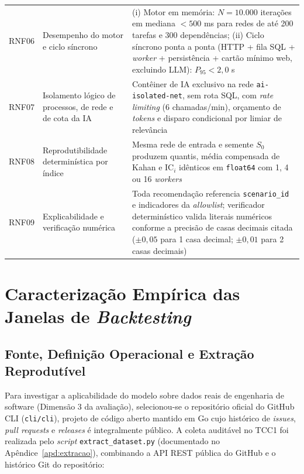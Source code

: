 \documentclass[12pt,openany,oneside,a4paper,english,brazilian,sumario=tradicional]{abntex2}
\newcommand{\fonteautores}{\par\vspace{1mm}{\small Fonte: Elaborado pelos autores (2026).}}
\newcommand{\IC}{\mathrm{IC}}
\begin{document}
\begin{table}[htbp]
\begin{tabularx}{\textwidth}{L{1.2cm} L{4.0cm} Y}
RNF06 & Desempenho do motor e ciclo síncrono & (i) Motor em memória: $N=10.000$ iterações em mediana $< 500$ ms para redes de até 200 tarefas e 300 dependências; (ii) Ciclo síncrono ponta a ponta (HTTP + fila SQL + \textit{worker} + persistência + cartão mínimo web, excluindo LLM): $P_{95} < 2{,}0$ s\\
RNF07 & Isolamento lógico de processos, de rede e de cota da IA & Contêiner de IA exclusivo na rede \texttt{ai-isolated-net}, sem rota SQL, com \textit{rate limiting} (6 chamadas/min), orçamento de \textit{tokens} e disparo condicional por limiar de relevância\\
RNF08 & Reprodutibilidade determinística por índice & Mesma rede de entrada e semente $S_0$ produzem quantis, média compensada de Kahan e $\IC_i$ idênticos em \texttt{float64} com 1, 4 ou 16 \textit{workers}\\
RNF09 & Explicabilidade e verificação numérica & Toda recomendação referencia \texttt{scenario\_\allowbreak id} e indicadores da \textit{allowlist}; verificador determinístico valida literais numéricos conforme a precisão de casas decimais citada ($\pm 0{,}05$ para 1 casa decimal; $\pm 0{,}01$ para 2 casas decimais)\\
\bottomrule
\end{tabularx}
\fonteautores
\end{table}

\section{Caracterização Empírica das Janelas de \textit{Backtesting}}\label{sec:backtesting}

\subsection{Fonte, Definição Operacional e Extração Reprodutível}

Para investigar a aplicabilidade do modelo sobre dados reais de engenharia de software (Dimensão 3 da avaliação), selecionou-se o repositório oficial do GitHub CLI (\texttt{cli/\allowbreak cli}), projeto de código aberto mantido em Go cujo histórico de \textit{issues}, \textit{pull requests} e \textit{releases} é integralmente público. A coleta auditável no TCC1 foi realizada pelo \textit{script} \texttt{extract\_\allowbreak dataset.py} (documentado no Apêndice~\ref{apd:extracao}), combinando a API REST pública do GitHub e o histórico Git do repositório:
\end{document}
